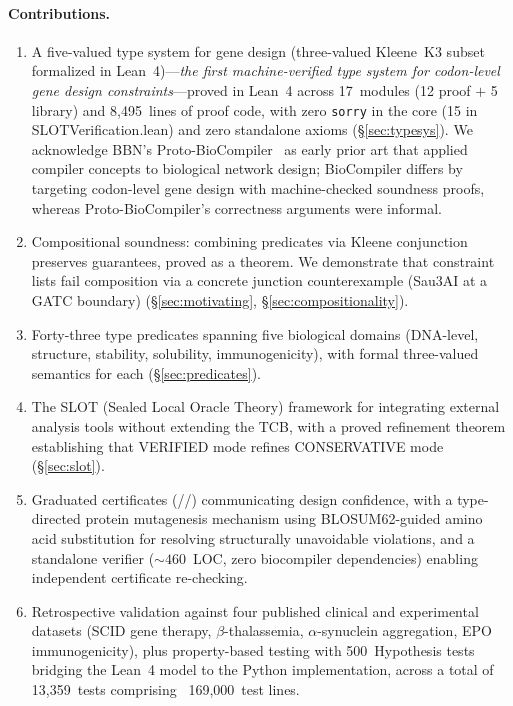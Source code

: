 \paragraph{Contributions.}
\begin{enumerate}[leftmargin=*,itemsep=1pt,topsep=2pt]
\item A five-valued type system for gene design (three-valued Kleene~K3
      subset formalized in Lean~4)---\emph{the first machine-verified type
      system for codon-level gene design constraints}---proved in
      Lean~4 across 17~modules (12 proof $+$ 5 library) and
      8,495~lines of proof code, with zero \texttt{sorry} in the core (15 in SLOTVerification.lean) and zero standalone
      axioms (\S\ref{sec:typesys}).  We acknowledge BBN's
      Proto-BioCompiler~\cite{beal2011protobiocompiler} as early prior
      art that applied compiler concepts to biological network design;
      BioCompiler differs by targeting codon-level gene design with
      machine-checked soundness proofs, whereas Proto-BioCompiler's
      correctness arguments were informal.

\item Compositional soundness: combining predicates via Kleene
      conjunction preserves guarantees, proved as a theorem.
      We demonstrate that constraint lists fail composition via a
      concrete junction counterexample (Sau3AI at a GATC boundary)
      (\S\ref{sec:motivating}, \S\ref{sec:compositionality}).

\item Forty-three type predicates spanning five biological domains
      (DNA-level, structure, stability, solubility, immunogenicity),
      with formal three-valued semantics for each
      (\S\ref{sec:predicates}).

\item The SLOT (Sealed Local Oracle Theory) framework for
      integrating external analysis tools without extending the TCB,
      with a proved refinement theorem establishing that VERIFIED mode
      refines CONSERVATIVE mode (\S\ref{sec:slot}).

\item Graduated certificates (\GOLD/\SILVER/\BRONZE) communicating
      design confidence, with a type-directed protein mutagenesis
      mechanism using BLOSUM62-guided amino acid substitution for
      resolving structurally unavoidable violations, and a standalone
      verifier (${\sim}460$~LOC, zero biocompiler dependencies)
      enabling independent certificate re-checking.

\item Retrospective validation against four published clinical and
      experimental datasets (SCID gene therapy, $\beta$-thalassemia,
      $\alpha$-synuclein aggregation, EPO immunogenicity), plus
      property-based testing with 500~Hypothesis tests bridging the
      Lean~4 model to the Python implementation, across a total of
      13,359~tests comprising ~169,000~test lines.
\end{enumerate}

